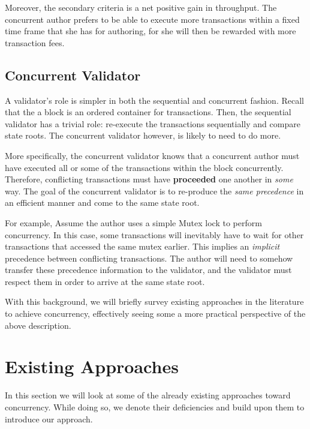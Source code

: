 Moreover, the secondary criteria is a net positive gain in throughput. The concurrent author prefers
to be able to execute more transactions within a fixed time frame that she has for authoring, for
she will then be rewarded with more transaction fees.

\subsection{Concurrent Validator}

A validator's role is simpler in both the sequential and concurrent fashion. Recall that the a block
is an ordered container for transactions. Then, the sequential validator has a trivial role:
re-execute the transactions sequentially and compare state roots. The concurrent validator however,
is likely to need to do more.

More specifically, the concurrent validator knows that a concurrent author must have executed all or
some of the transactions within the block concurrently. Therefore, conflicting transactions must
have \textbf{proceeded} one another in \textit{some} way. The goal of the concurrent validator is to
re-produce the \textit{same precedence} in an efficient manner and come to the same state root.

For example, Assume the author uses a simple Mutex lock to perform concurrency. In this case, some
transactions will inevitably have to wait for other transactions that accessed the same mutex
earlier. This implies an \textit{implicit} precedence between conflicting transactions. The author
will need to somehow transfer these precedence information to the validator, and the validator must
respect them in order to arrive at the same state root.

With this background, we will briefly survey existing approaches in the literature to achieve
concurrency, effectively seeing some a more practical perspective of the above description.

\section{Existing Approaches}


In this section we will look at some of the already existing approaches toward concurrency. While
doing so, we denote their deficiencies and build upon them to introduce our approach.

